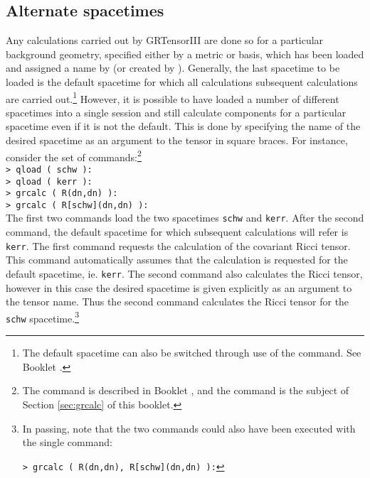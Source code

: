 \documentclass{article}
\begin{document}
\subsection{Alternate spacetimes} \label{sec:altg}
%
Any calculations carried out by GRTensorIII are done so for a particular
background geometry, specified either by a metric or basis, which has
been loaded and assigned a name by  (or created by
). Generally, the last spacetime to be loaded is the
default spacetime for which all calculations subsequent calculations are
carried out.\footnote{The default spacetime can also be switched through
use of the  command. See Booklet \grMakegRef.}
However, it is possible to have
loaded a number of different spacetimes into a single session and still
calculate components for a particular spacetime even if it is not the
default. This is done by specifying the name of the desired spacetime
as an argument to the tensor in square braces. For instance, consider
the set of commands:\footnote{The  command is described in
Booklet \grMakegRef, and the  command is the subject of
Section \ref{sec:grcalc} of this booklet.}\\

\noindent\texttt{> qload ( schw ):} \\
\texttt{> qload ( kerr ):} \\
\texttt{> grcalc ( R(dn,dn) ):} \\
\texttt{> grcalc ( R[schw](dn,dn) ):} \\

\noindent The first two commands load the two spacetimes \texttt{schw}
and \texttt{kerr}. After the second command, the default spacetime for
which subsequent  calculations will refer is \texttt{kerr}. The first
 command requests the calculation of the covariant Ricci
tensor. This command automatically assumes that the calculation is
requested for the default spacetime, ie. \texttt{kerr}.
The second  command also  calculates the Ricci tensor,
however in this case the desired spacetime is given explicitly as an
argument to the tensor name. Thus the second command calculates the
Ricci tensor for the \texttt{schw} spacetime.\footnote{In passing, note
that the two  commands could also have been executed with
the single command:

\texttt{> grcalc ( R(dn,dn), R[schw](dn,dn) ):}}\\
\end{document}
